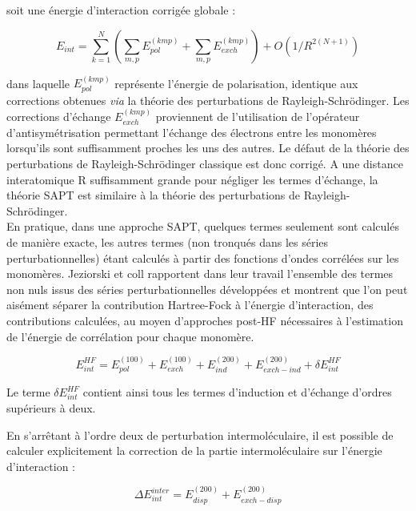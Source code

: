 	soit une énergie d’interaction corrigée globale :
	
	\begin{equation}
	E_{int} = \sum_{k=1}^{N} ( \sum_{m,p} E_{pol}^{(kmp)} + \sum_{m,p} E_{exch}^{(kmp)} ) + O(1/R^{2 (N+1)})
	\end{equation}
	
	\noindent dans laquelle $E_{pol}^{(kmp)}$ représente l'énergie de polarisation, identique aux corrections obtenues \textit{via} la théorie des perturbations de Rayleigh-Schr\"{o}dinger. Les corrections d'échange $E_{exch}^{(kmp)}$ proviennent de l'utilisation de l'opérateur d'antisymétrisation permettant l'échange des électrons entre les monomères lorsqu'ils sont suffisamment proches les uns des autres. Le défaut de la théorie des perturbations de Rayleigh-Schr\"{o}dinger classique est donc corrigé. A une distance interatomique R suffisamment grande pour négliger les termes d'échange, la théorie SAPT est similaire à la théorie des perturbations de Rayleigh-Schr\"{o}dinger.\\
	
	En pratique, dans une approche SAPT, quelques termes seulement sont calculés de manière exacte, les autres termes (non tronqués dans les séries perturbationnelles) étant calculés à partir des fonctions d’ondes corrélées sur les monomères. Jeziorski et coll \cite{patkowski2004unified,jeziorski1994perturbation} rapportent dans leur travail l’ensemble des termes non nuls issus des séries perturbationnelles développées et montrent que l’on peut aisément séparer la contribution Hartree-Fock à l’énergie d’interaction, des contributions calculées, au moyen d’approches post-HF nécessaires à l’estimation de l’énergie de corrélation pour chaque monomère. 
	
	\begin{equation}
	E_{int}^{HF} =  E_{pol}^{(100)} + E_{exch}^{(100)} + E_{ind}^{(200)} + E_{exch-ind}^{(200)} + \delta E_{int}^{HF}
	\end{equation}
	
	Le terme $\delta E_{int}^{HF}$ contient ainsi tous les termes d'induction et d'échange d’ordres supérieurs à deux.
	
	En s’arrêtant à l’ordre deux de perturbation intermoléculaire, il est possible de calculer explicitement la correction de la partie intermoléculaire sur l’énergie d’interaction :
	
	\begin{equation}
	\Delta E_{int}^{inter} =  E_{disp}^{(200)} + E_{exch-disp}^{(200)}
	\end{equation}
	
